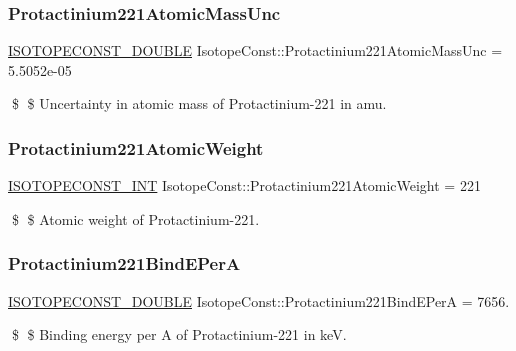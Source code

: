 \subsubsection{\texorpdfstring{Protactinium221\+Atomic\+Mass\+Unc}{Protactinium221AtomicMassUnc}}
{\footnotesize\ttfamily \mbox{\hyperlink{group___isotope_const-_macros_ga8f45a7272ce02c0b4c65c44636ed719a}{I\+S\+O\+T\+O\+P\+E\+C\+O\+N\+S\+T\+\_\+\+D\+O\+U\+B\+LE}} Isotope\+Const\+::\+Protactinium221\+Atomic\+Mass\+Unc = 5.\+5052e-\/05}

\$ \$ Uncertainty in atomic mass of Protactinium-\/221 in amu. \mbox{\label{group___isotope_const-_protactinium-_pa221_ga21ec0757d3b9275a327fa85653eb7d97}} 
\subsubsection{\texorpdfstring{Protactinium221\+Atomic\+Weight}{Protactinium221AtomicWeight}}
{\footnotesize\ttfamily \mbox{\hyperlink{group___isotope_const-_macros_ga5f18360b3e99483a35c32d789e62621c}{I\+S\+O\+T\+O\+P\+E\+C\+O\+N\+S\+T\+\_\+\+I\+NT}} Isotope\+Const\+::\+Protactinium221\+Atomic\+Weight = 221}

\$ \$ Atomic weight of Protactinium-\/221. \mbox{\label{group___isotope_const-_protactinium-_pa221_gab26eaabc533766d7bcedafc75c770cc2}} 
\subsubsection{\texorpdfstring{Protactinium221\+Bind\+E\+PerA}{Protactinium221BindEPerA}}
{\footnotesize\ttfamily \mbox{\hyperlink{group___isotope_const-_macros_ga8f45a7272ce02c0b4c65c44636ed719a}{I\+S\+O\+T\+O\+P\+E\+C\+O\+N\+S\+T\+\_\+\+D\+O\+U\+B\+LE}} Isotope\+Const\+::\+Protactinium221\+Bind\+E\+PerA = 7656.}

\$ \$ Binding energy per A of Protactinium-\/221 in keV. \mbox{\label{group___isotope_const-_protactinium-_pa221_ga300d66d56a42b04f56bc85f39df2cb3a}} 
